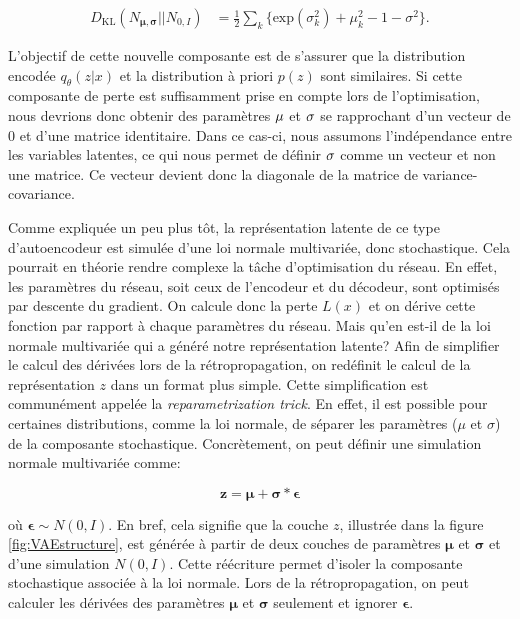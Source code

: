 \begin{equation}  \label{eq:kl4}
\begin{aligned}
D_{\text{KL}}(N_{\boldsymbol \mu, \boldsymbol \sigma} || N_{0,I}) &= \frac{1}{2} \sum_{k}\Big\{\text{exp}(\sigma_{k}^2) + \mu_{k}^2 - 1 - \sigma^2\Big\}.
\end{aligned}
\end{equation}


 L'objectif de cette nouvelle composante est de s'assurer que la distribution encodée $q_{\theta}(z|x)$ et la distribution à priori $p(z)$ sont similaires. Si cette composante de perte est suffisamment prise en compte lors de l'optimisation, nous devrions donc obtenir des paramètres $\boldmath \mu$ et $\boldmath \sigma$ se rapprochant d'un vecteur de 0 et d'une matrice identitaire. Dans ce cas-ci, nous assumons l'indépendance entre les variables latentes, ce qui nous permet de définir $\boldmath \sigma$ comme un vecteur et non une matrice. Ce vecteur devient donc la diagonale de la matrice de variance-covariance.

Comme expliquée un peu plus tôt, la représentation latente de ce type d'autoencodeur est simulée d'une loi normale multivariée, donc stochastique. Cela pourrait en théorie rendre complexe la tâche d'optimisation du réseau. En effet, les paramètres du réseau, soit ceux de l'encodeur et du décodeur, sont optimisés par descente du gradient. On calcule donc la perte $L(x)$ et on dérive cette fonction par rapport à chaque paramètres du réseau. Mais qu'en est-il de la loi normale multivariée qui a généré notre représentation latente? Afin de simplifier le calcul des dérivées lors de la rétropropagation, on redéfinit le calcul de la représentation $z$ dans un format plus simple. Cette simplification est communément appelée la  \textit{reparametrization trick}. En effet, il est possible pour certaines distributions, comme la loi normale, de séparer les paramètres ($\mu$ et $\sigma$)  de la composante stochastique. Concrètement, on peut définir une simulation normale multivariée comme:

$$
\boldsymbol{z} = \boldsymbol{\mu} + \boldsymbol{\sigma} *\boldsymbol{\epsilon}
$$

où $\boldsymbol{\epsilon} \sim N(0,I)$. En bref, cela signifie que la couche $z$, illustrée dans la figure \ref{fig:VAEstructure}, est générée à partir de deux couches de paramètres $\boldsymbol{\mu}$ et $\boldsymbol{\sigma}$ et d'une simulation $N(0,I)$. Cette réécriture permet d'isoler la composante stochastique associée à la loi normale. Lors de la rétropropagation, on peut calculer les dérivées des paramètres $\boldsymbol{\mu}$ et $\boldsymbol{\sigma}$ seulement et ignorer $\boldsymbol{\epsilon}$. 

